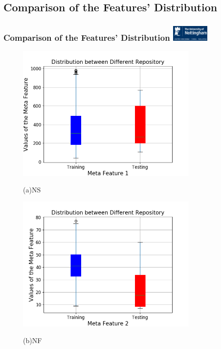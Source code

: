 \documentclass[aspectratio=1610]{beamer}
\newcommand{\UoN}
  {\hfill {\includegraphics[height=0.8cm]{nott_logo/nott_logo_white.png}}}
\begin{document}
\subsection{Comparison of the Features' Distribution}
\begin{frame}
\frametitle{Comparison of the Features' Distribution \UoN}
\begin{figure}
	\centering
	\begin{minipage}[t]{0.25\linewidth}
		\centering
		\includegraphics[width=0.8\textwidth]{Figures/Meta_Features/Feature_1.png}
		\parbox{1cm}{\small \hspace{3.5cm}(a){\scriptsize{NS}}}
	\end{minipage}
	\begin{minipage}[t]{0.25\linewidth}
		\centering
		\includegraphics[width=0.8\textwidth]{Figures/Meta_Features/Feature_2.png}
		\parbox{1cm}{\small \hspace{3.5cm}(b)\scriptsize{NF}}
	\end{minipage}
	\begin{minipage}[t]{0.25\linewidth}

\end{minipage}
\end{figure}
\end{frame}
\end{document}
